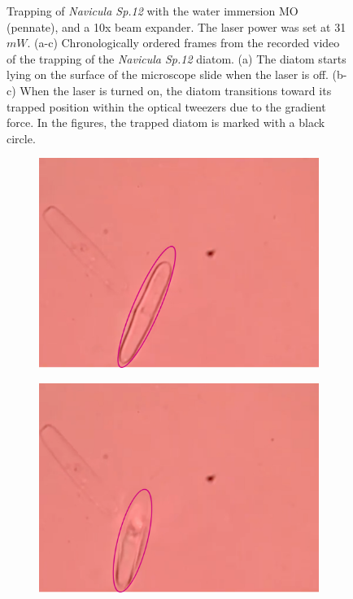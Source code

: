 \documentclass[letterpaper,12pt,oneside]{book}
\begin{document}
\begin{figure}[H]
     \caption{Trapping of \textit{Navicula Sp.12} with the water immersion MO (pennate), and a 10x beam expander. The laser power was set at 31 $mW$. (a-c) Chronologically ordered frames from the recorded video of the trapping of the \textit{Navicula Sp.12} diatom. (a) The diatom starts lying on the surface of the microscope slide when the laser is off. (b-c) When the laser is turned on, the diatom transitions toward its trapped position within the optical tweezers due to the gradient force. In the figures, the trapped diatom is marked with a black circle.}
\label{WITHIRD1}
     
\end{figure}
\begin{figure}[H]
     \centering
     \begin{subfigure}[b]{0.3\textwidth}
         \centering
         \includegraphics[width=\textwidth]{Results/Fifth/pennate1water.png}
         \caption{}
         \label{fig:y equals x}
     \end{subfigure}
     \hfill
     \begin{subfigure}[b]{0.3\textwidth}
         \centering
         \includegraphics[width=\textwidth]{Results/Fifth/pennatewater2.png}

\end{subfigure}
\end{figure}
\end{document}

